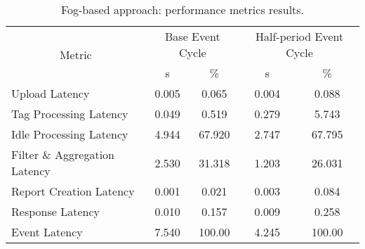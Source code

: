 \begin{table}[ht!]
\centering
\caption{Fog-based approach: performance metrics results.}
\label{table:fog_metrics}
\begin{tabular}{|l|c|c|c|c|}
\hline
\multicolumn{1}{|c|}{\multirow{2}{*}{Metric}} & \multicolumn{2}{c|}{Base Event Cycle} & \multicolumn{2}{c|}{Half-period Event Cycle} \\
\multicolumn{1}{|c|}{}                        & s                 & \%                & s                    & \%                    \\ \hline
Upload Latency                                & 0.005             & 0.065             & 0.004                & 0.088                 \\ \hline
Tag Processing Latency                        & 0.049             & 0.519             & 0.279                & 5.743                 \\ \hline
Idle Processing Latency                       & 4.944             & 67.920            & 2.747                & 67.795                \\ \hline
Filter \& Aggregation Latency                 & 2.530             & 31.318            & 1.203                & 26.031                \\ \hline
Report Creation Latency                       & 0.001             & 0.021             & 0.003                & 0.084                 \\ \hline
Response Latency                              & 0.010             & 0.157             & 0.009                & 0.258                 \\ \hline
Event Latency                                 & 7.540             & 100.00            & 4.245                & 100.00                \\ \hline
\end{tabular}
\end{table}
